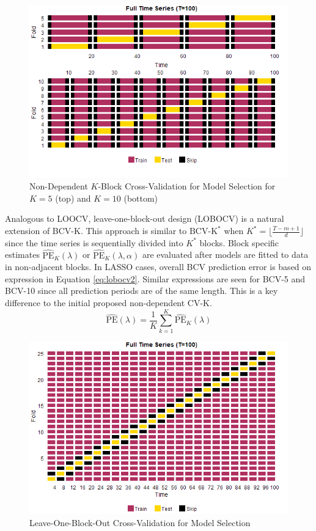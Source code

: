 \begin{figure}[htbp!]
	\caption{Non-Dependent $K$-Block Cross-Validation for Model Selection for $K=5$ (top) and $K=10$ (bottom)}
	\center
	\label{fig:bcvplots}
	\includegraphics[scale=0.58]{bcvplots}
\end{figure}

Analogous to LOOCV, leave-one-block-out design (LOBOCV) is a natural extension of BCV-K. This approach is similar to $\textrm{BCV-K}^*$ when $K^*=\lfloor \frac{T-m+1}{d} \rfloor$ since the time series is sequentially divided into $K^*$ blocks. Block specific estimates $\widehat{\textrm{PE}}_K(\lambda)$ or $\widehat{\textrm{PE}}_K(\lambda,\alpha)$ are evaluated after models are fitted to data in non-adjacent blocks. In LASSO cases, overall BCV prediction error is based on expression in Equation \ref{eq:lobocv2}. Similar expressions are seen for BCV-5 and BCV-10 since all prediction periods are of the same length. This is a key difference to the initial proposed non-dependent CV-K.
\begin{equation}
\label{eq:lobocv2}
	\widehat{\textrm{PE}}(\lambda)=\frac{1}{K}\sum\limits_{k=1}^K \widehat{\textrm{PE}}_K(\lambda)
\end{equation}

\begin{figure}[htbp!]
	\caption{Leave-One-Block-Out Cross-Validation for Model Selection}
	\center
	\label{fig:lobocvplots}
	\includegraphics[scale=0.58]{lobocvplots}
\end{figure}

